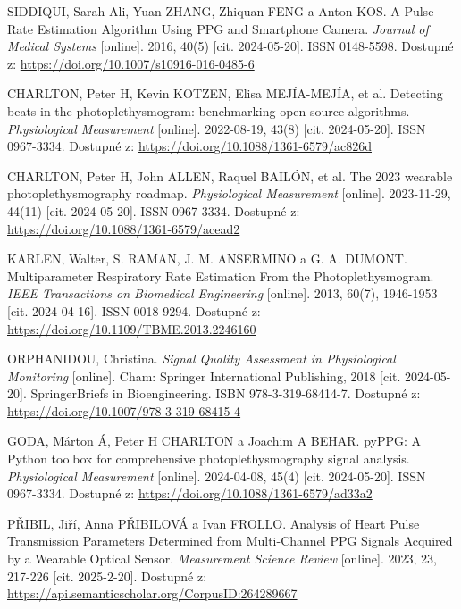 \begin{thebibliography}{99}
		SIDDIQUI, Sarah Ali, Yuan ZHANG, Zhiquan FENG a Anton KOS.
		A Pulse Rate Estimation Algorithm Using PPG and Smartphone Camera.
		\emph{Journal of Medical Systems} [online].
		2016, 40(5) [cit. 2024-05-20].
		ISSN 0148-5598.
		Dostupné z: \url{https://doi.org/10.1007/s10916-016-0485-6}

		CHARLTON, Peter H, Kevin KOTZEN, Elisa MEJÍA-MEJÍA, et al.
		Detecting beats in the photoplethysmogram: benchmarking open-source algorithms.
		\emph{Physiological Measurement} [online].
		2022-08-19, 43(8) [cit. 2024-05-20].
		ISSN 0967-3334.
		Dostupné z: \url{https://doi.org/10.1088/1361-6579/ac826d}

		CHARLTON, Peter H, John ALLEN, Raquel BAILÓN, et al.
		The 2023 wearable photoplethysmography roadmap.
		\emph{Physiological Measurement} [online].
		2023-11-29, 44(11) [cit. 2024-05-20].
		ISSN 0967-3334.
		Dostupné z: \url{https://doi.org/10.1088/1361-6579/acead2}

		KARLEN, Walter, S. RAMAN, J. M. ANSERMINO a G. A. DUMONT.
		Multiparameter Respiratory Rate Estimation From the Photoplethysmogram.
		\emph{IEEE Transactions on Biomedical Engineering} [online].
		2013, 60(7), 1946-1953 [cit. 2024-04-16].
		ISSN 0018-9294.
		Dostupné z: \url{https://doi.org/10.1109/TBME.2013.2246160}

		ORPHANIDOU, Christina.
		\emph{Signal Quality Assessment in Physiological Monitoring} [online].
		Cham: Springer International Publishing, 2018 [cit. 2024-05-20].
		SpringerBriefs in Bioengineering.
		ISBN 978-3-319-68414-7.
		Dostupné z: \url{https://doi.org/10.1007/978-3-319-68415-4}

		GODA, Márton Á, Peter H CHARLTON a Joachim A BEHAR.
		pyPPG: A Python toolbox for comprehensive photoplethysmography signal analysis.
		\emph{Physiological Measurement} [online].
		2024-04-08, 45(4) [cit. 2024-05-20].
		ISSN 0967-3334.
		Dostupné z: \url{https://doi.org/10.1088/1361-6579/ad33a2}

		PŘIBIL, Jiří, Anna PŘIBILOVÁ a Ivan FROLLO.
		Analysis of Heart Pulse Transmission Parameters Determined from Multi-Channel PPG Signals Acquired by a Wearable Optical Sensor.
		\emph{Measurement Science Review} [online].
		2023, 23, 217-226 [cit. 2025-2-20].
		Dostupné z: \url{https://api.semanticscholar.org/CorpusID:264289667}


\end{thebibliography}
